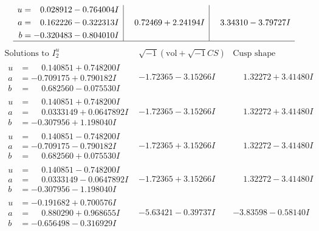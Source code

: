 \documentclass[1p]{elsarticle_modified}
\theoremstyle{definition}
\newcommand{\I}{\sqrt{-1}}
\begin{document}
$$\begin{array}{c|c|c}
\begin{aligned}
u &= \phantom{-}0.028912 - 0.764004 I \\
a &= \phantom{-}0.162226 - 0.322313 I \\
b &= -0.320483 - 0.804010 I\end{aligned}
 & \phantom{-}0.72469 + 2.24194 I & \phantom{-}3.34310 - 3.79727 I\\
 \hline 
 \end{array}$$\newpage$$\begin{array}{c|c|c}  
\text{Solutions to }I^u_{2}& \I (\text{vol} + \sqrt{-1}CS) & \text{Cusp shape}\\
 \hline 
\begin{aligned}
u &= \phantom{-}0.140851 + 0.748200 I \\
a &= -0.709175 + 0.790182 I \\
b &= \phantom{-}0.682560 - 0.075530 I\end{aligned}
 & -1.72365 - 3.15266 I & \phantom{-}1.32272 + 3.41480 I \\ \hline\begin{aligned}
u &= \phantom{-}0.140851 + 0.748200 I \\
a &= \phantom{-}0.0333149 + 0.0647892 I \\
b &= -0.307956 + 1.198040 I\end{aligned}
 & -1.72365 - 3.15266 I & \phantom{-}1.32272 + 3.41480 I \\ \hline\begin{aligned}
u &= \phantom{-}0.140851 - 0.748200 I \\
a &= -0.709175 - 0.790182 I \\
b &= \phantom{-}0.682560 + 0.075530 I\end{aligned}
 & -1.72365 + 3.15266 I & \phantom{-}1.32272 - 3.41480 I \\ \hline\begin{aligned}
u &= \phantom{-}0.140851 - 0.748200 I \\
a &= \phantom{-}0.0333149 - 0.0647892 I \\
b &= -0.307956 - 1.198040 I\end{aligned}
 & -1.72365 + 3.15266 I & \phantom{-}1.32272 - 3.41480 I \\ \hline\begin{aligned}
u &= -0.191682 + 0.700576 I \\
a &= \phantom{-}0.880290 + 0.968655 I \\
b &= -0.656498 - 0.316929 I\end{aligned}
 & -5.63421 - 0.39737 I & -3.83598 - 0.58140 I \\ \hline\begin{aligned}

\end{aligned}
\end{array}$$
\end{document}
